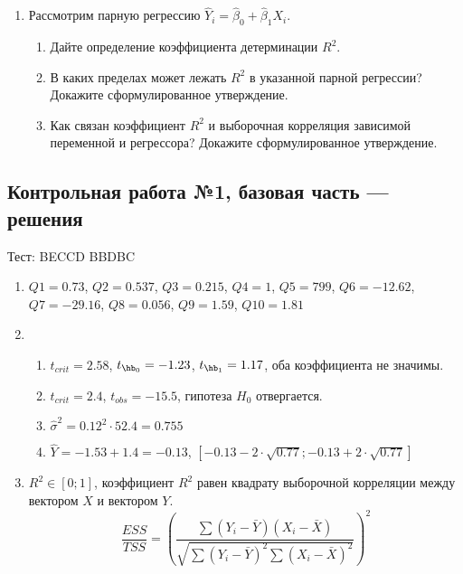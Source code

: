 \begin{enumerate}
\begin{enumerate}
\end{enumerate}


\item Рассмотрим парную регрессию $\hat Y_i = \hat\beta_0 + \hat\beta_1 X_i$.

\begin{enumerate}
\item Дайте определение коэффициента детерминации $R^2$.
\item В каких пределах может лежать $R^2$ в указанной парной регрессии? Докажите сформулированное утверждение.
\item Как связан коэффициент $R^2$ и выборочная корреляция зависимой переменной и регрессора? Докажите сформулированное утверждение. 
\end{enumerate}




\end{enumerate}


\subsection{Контрольная работа №1, базовая часть — решения}

Тест: BECCD BBDBC

\begin{enumerate}
\item $Q1 = 0.73$, $Q2 = 0.537$, $Q3 = 0.215$, $Q4 = 1$, $Q5 = 799$, 
$Q6 = -12.62$, $Q7 = -29.16$, $Q8 = 0.056$, $Q9 = 1.59$, $Q10 = 1.81$


\item 
\begin{enumerate}
\item $t_{crit} = 2.58$, $t_{\hb_0} = -1.23$, $t_{\hb_1} = 1.17$, оба коэффициента не значимы.
\item $t_{crit} = 2.4$, $t_{obs} = -15.5$, гипотеза $H_0$ отвергается.
\item $\hat \sigma^2 = 0.12^2 \cdot 52.4 = 0.755$
\item $\hat Y = -1.53 + 1.4 = -0.13$, $[-0.13 - 2\cdot \sqrt{0.77}; -0.13 + 2\cdot \sqrt{0.77} ]$
\end{enumerate}

\item $R^2 \in [0;1]$, коэффициент $R^2$ равен квадрату выборочной корреляции между вектором $X$ и вектором $Y$.
\[
\frac{ESS}{TSS} = \left(\frac{\sum (Y_i - \bar Y)(X_i - \bar X)}{\sqrt{\sum (Y_i - \bar Y)^2 \sum (X_i - \bar X)^2}}\right)^2
\]
  
\end{enumerate}


